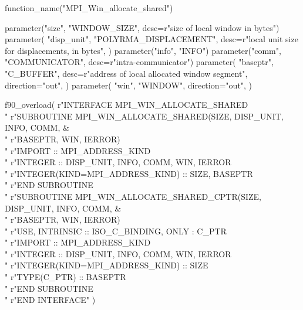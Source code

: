 %
%
\begin{mpi-binding}
    function_name("MPI_Win_allocate_shared")
    
    parameter("size", "WINDOW_SIZE", desc=r"size of local window in bytes")
    parameter(
        "disp_unit",
        "POLYRMA_DISPLACEMENT",
        desc=r"local unit size for displacements, in bytes",
    )
    parameter("info", "INFO")
    parameter("comm", "COMMUNICATOR", desc=r"intra-communicator")
    parameter(
        "baseptr",
        "C_BUFFER",
        desc=r"address of local allocated window segment",
        direction="out",
    )
    parameter(
        "win",
        "WINDOW",
        direction="out",
    )
    
    f90_overload(
        r"\>INTERFACE MPI\_WIN\_ALLOCATE\_SHARED \\ "
        r"\>\>SUBROUTINE MPI\_WIN\_ALLOCATE\_SHARED(SIZE, DISP\_UNIT, INFO, COMM, \& \\ "
        r"\>\>\>\>BASEPTR, WIN, IERROR) \\ "
        r"\>\>\>IMPORT :: MPI\_ADDRESS\_KIND \\ "
        r"\>\>\>INTEGER :: DISP\_UNIT, INFO, COMM, WIN, IERROR \\ "
        r"\>\>\>INTEGER(KIND=MPI\_ADDRESS\_KIND) :: SIZE, BASEPTR \\ "
        r"\>\>END SUBROUTINE \\ "
        r"\>\>SUBROUTINE MPI\_WIN\_ALLOCATE\_SHARED\_CPTR(SIZE, DISP\_UNIT, INFO, COMM, \& \\ "
        r"\>\>\>\>BASEPTR, WIN, IERROR) \\ "
        r"\>\>\>USE, INTRINSIC :: ISO\_C\_BINDING, ONLY : C\_PTR \\ "
        r"\>\>\>IMPORT :: MPI\_ADDRESS\_KIND \\ "
        r"\>\>\>INTEGER :: DISP\_UNIT, INFO, COMM, WIN, IERROR \\ "
        r"\>\>\>INTEGER(KIND=MPI\_ADDRESS\_KIND) :: SIZE \\ "
        r"\>\>\>TYPE(C\_PTR) :: BASEPTR \\ "
        r"\>\>END SUBROUTINE \\ "
        r"\>END INTERFACE"
    )
\end{mpi-binding}


